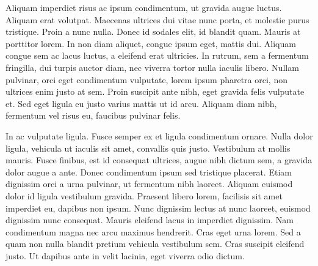 \documentclass{article}
\begin{document}
Aliquam imperdiet risus ac ipsum condimentum, ut gravida augue luctus. Aliquam erat volutpat. Maecenas ultrices dui vitae nunc porta, et molestie purus tristique. Proin a nunc nulla. Donec id sodales elit, id blandit quam. Mauris at porttitor lorem. In non diam aliquet, congue ipsum eget, mattis dui. Aliquam congue sem ac lacus luctus, a eleifend erat ultricies. In rutrum, sem a fermentum fringilla, dui turpis auctor diam, nec viverra tortor nulla iaculis libero. Nullam pulvinar, orci eget condimentum vulputate, lorem ipsum pharetra orci, non ultrices enim justo at sem. Proin suscipit ante nibh, eget gravida felis vulputate et. Sed eget ligula eu justo varius mattis ut id arcu. Aliquam diam nibh, fermentum vel risus eu, faucibus pulvinar felis.


In ac vulputate ligula. Fusce semper ex et ligula condimentum ornare. Nulla dolor ligula, vehicula ut iaculis sit amet, convallis quis justo. Vestibulum at mollis mauris. Fusce finibus, est id consequat ultrices, augue nibh dictum sem, a gravida dolor augue a ante. Donec condimentum ipsum sed tristique placerat. Etiam dignissim orci a urna pulvinar, ut fermentum nibh laoreet. Aliquam euismod dolor id ligula vestibulum gravida. Praesent libero lorem, facilisis sit amet imperdiet eu, dapibus non ipsum. Nunc dignissim lectus at nunc laoreet, euismod dignissim nunc consequat. Mauris eleifend lacus in imperdiet dignissim. Nam condimentum magna nec arcu maximus hendrerit. Cras eget urna lorem. Sed a quam non nulla blandit pretium vehicula vestibulum sem. Cras suscipit eleifend justo. Ut dapibus ante in velit lacinia, eget viverra odio dictum.
\end{document}
